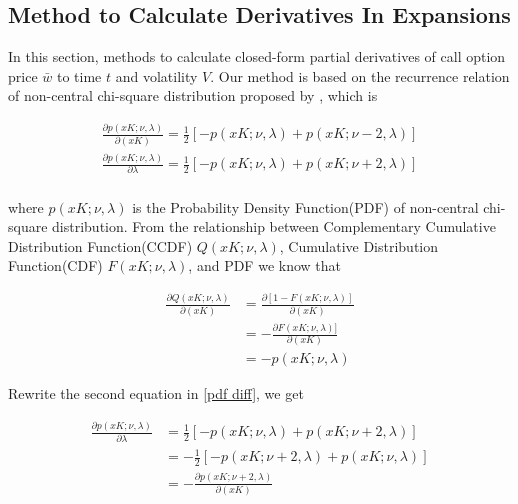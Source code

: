 \subsection{Method to Calculate Derivatives In Expansions}

In this section, methods to calculate closed-form partial derivatives of call option price $\bar{w}$ to time $t$ and volatility $V$. Our method is based on the recurrence relation of non-central chi-square distribution proposed by \cite{cohen_noncentral_1988}, which is

\begin{equation}\label{pdf diff}
    \begin{gathered}
        \frac{\partial p(xK;\nu,\lambda)}{\partial (xK)}=\frac{1}{2}[-p(xK ; \nu, \lambda)+p(xK ; \nu-2, \lambda)]\\
        \frac{\partial p(xK;\nu,\lambda)}{\partial \lambda}=\frac{1}{2}[-p(xK ; \nu, \lambda)+p(xK ; \nu+2, \lambda)] \\
    \end{gathered}
\end{equation}

\noindent where $p(xK;\nu,\lambda)$ is the Probability Density Function(PDF) of non-central chi-square distribution. From the relationship between Complementary Cumulative Distribution Function(CCDF) $Q(xK;\nu,\lambda)$, Cumulative Distribution Function(CDF) $F(xK;\nu,\lambda)$, and PDF we know that

\begin{equation}\label{CCDF2x}
    \begin{aligned}
        \frac{\partial Q(xK; \nu, \lambda)}{\partial (xK)}&=\frac{\partial[1-F(xK; \nu, \lambda)]}{\partial (xK)} \\ 
        &=-\frac{\partial F(xK; \nu, \lambda)]}{\partial (xK)}\\
        &= -p(xK;\nu,\lambda)
    \end{aligned}
\end{equation}

\noindent Rewrite the second equation in \eqref{pdf diff}, we get

\begin{equation}\label{pdf trans}
    \begin{aligned}
        \frac{\partial p(xK;\nu,\lambda)}{\partial \lambda}&=\frac{1}{2}[-p(xK ; \nu, \lambda)+p(xK ; \nu+2, \lambda)] \\
        &=-\frac{1}{2}[-p(xK ; \nu+2, \lambda)+p(xK ; \nu, \lambda)]\\
        &= -\frac{\partial p(xK;\nu+2,\lambda)}{\partial (xK)}
    \end{aligned}
\end{equation}

